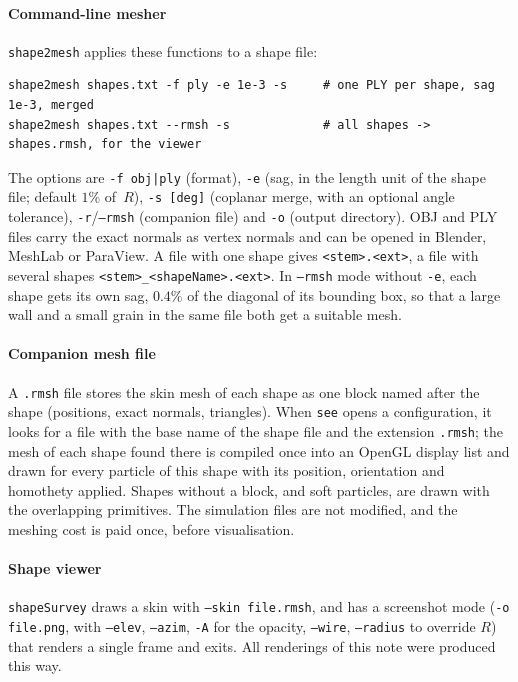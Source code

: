 \documentclass[11pt,a4paper]{article}
\newcommand{\Rmink}{R}                 %
\newcommand{\code}[1]{\texttt{#1}}
\begin{document}
\paragraph{Command-line mesher} \code{shape2mesh} applies these functions to a
shape file:
{\small
\begin{verbatim}
shape2mesh shapes.txt -f ply -e 1e-3 -s     # one PLY per shape, sag 1e-3, merged
shape2mesh shapes.txt --rmsh -s             # all shapes -> shapes.rmsh, for the viewer
\end{verbatim}
}
\noindent The options are \code{-f obj|ply} (format), \code{-e} (sag, in the length
unit of the shape file; default $1\%$ of~$\Rmink$), \code{-s [deg]} (coplanar merge,
with an optional angle tolerance), \code{-r}/\code{--rmsh} (companion file) and
\code{-o} (output directory). OBJ and PLY files carry the exact normals as vertex
normals and can be opened in Blender, MeshLab or ParaView. A file with one shape
gives \code{<stem>.<ext>}, a file with several shapes
\code{<stem>\_<shapeName>.<ext>}. In \code{--rmsh} mode without \code{-e}, each
shape gets its own sag, $0.4\%$ of the diagonal of its bounding box, so that a large
wall and a small grain in the same file both get a suitable mesh.

\paragraph{Companion mesh file} A \code{.rmsh} file stores the skin mesh of each
shape as one block named after the shape (positions, exact normals, triangles).
When \code{see} opens a configuration, it looks for a file with the base name of
the shape file and the extension \code{.rmsh}; the mesh of each shape found there is
compiled once into an OpenGL display list and drawn for every particle of this
shape with its position, orientation and homothety applied. Shapes without a block,
and soft particles, are drawn with the overlapping primitives. The simulation files
are not modified, and the meshing cost is paid once, before visualisation.

\paragraph{Shape viewer} \code{shapeSurvey} draws a skin with
\code{--skin file.rmsh}, and has a screenshot mode (\code{-o file.png}, with
\code{--elev}, \code{--azim}, \code{-A} for the opacity, \code{--wire},
\code{--radius} to override $\Rmink$) that renders a single frame and exits. All
renderings of this note were produced this way.
\end{document}
